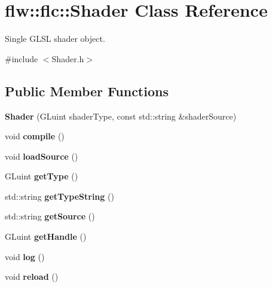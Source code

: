 \hypertarget{classflw_1_1flc_1_1Shader}{}\section{flw\+:\+:flc\+:\+:Shader Class Reference}
\label{classflw_1_1flc_1_1Shader}


Single G\+L\+SL shader object.  




{\ttfamily \#include $<$Shader.\+h$>$}

\subsection*{Public Member Functions}
\begin{DoxyCompactItemize}
\item 
{\bfseries Shader} (G\+Luint shader\+Type, const std\+::string \&shader\+Source)\hypertarget{classflw_1_1flc_1_1Shader_ac65c0360585de4f962ddf7acf6285d3a}{}\label{classflw_1_1flc_1_1Shader_ac65c0360585de4f962ddf7acf6285d3a}

\item 
void {\bfseries compile} ()\hypertarget{classflw_1_1flc_1_1Shader_aaf7d1de52102c20544704c380582898d}{}\label{classflw_1_1flc_1_1Shader_aaf7d1de52102c20544704c380582898d}

\item 
void {\bfseries load\+Source} ()\hypertarget{classflw_1_1flc_1_1Shader_a2909d6d3bcff34f8a5b87736b9ca8633}{}\label{classflw_1_1flc_1_1Shader_a2909d6d3bcff34f8a5b87736b9ca8633}

\item 
G\+Luint {\bfseries get\+Type} ()\hypertarget{classflw_1_1flc_1_1Shader_a9117ce7f099651b4fbdb5cd04c06a7f6}{}\label{classflw_1_1flc_1_1Shader_a9117ce7f099651b4fbdb5cd04c06a7f6}

\item 
std\+::string {\bfseries get\+Type\+String} ()\hypertarget{classflw_1_1flc_1_1Shader_ae199a2ec7cc360ae1c9c08bab60b0a71}{}\label{classflw_1_1flc_1_1Shader_ae199a2ec7cc360ae1c9c08bab60b0a71}

\item 
std\+::string {\bfseries get\+Source} ()\hypertarget{classflw_1_1flc_1_1Shader_a69a64f106385e1aeff080cfb5caa1df8}{}\label{classflw_1_1flc_1_1Shader_a69a64f106385e1aeff080cfb5caa1df8}

\item 
G\+Luint {\bfseries get\+Handle} ()\hypertarget{classflw_1_1flc_1_1Shader_ae048b15164e2949f826da825f08469cf}{}\label{classflw_1_1flc_1_1Shader_ae048b15164e2949f826da825f08469cf}

\item 
void {\bfseries log} ()\hypertarget{classflw_1_1flc_1_1Shader_a43307973fd283eef14eaf2cda4c3d2d9}{}\label{classflw_1_1flc_1_1Shader_a43307973fd283eef14eaf2cda4c3d2d9}

\item 
void {\bfseries reload} ()\hypertarget{classflw_1_1flc_1_1Shader_a5490ecfb46c5cd481100f6d43b77197e}{}\label{classflw_1_1flc_1_1Shader_a5490ecfb46c5cd481100f6d43b77197e}

\end{DoxyCompactItemize}


